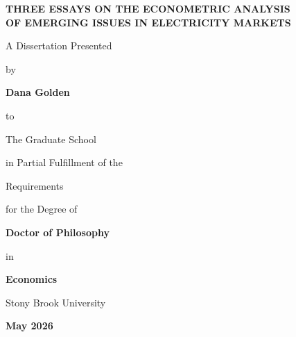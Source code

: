 \begin{titlepage}
\thispagestyle{empty}
\begin{singlespace}
\begin{center}
\vspace*{0.5in}

{\Large\bfseries THREE ESSAYS ON THE ECONOMETRIC ANALYSIS\\
OF EMERGING ISSUES IN ELECTRICITY MARKETS}

\vspace{1.0in}

A Dissertation Presented

\vspace{0.25in}

by

\vspace{0.25in}

{\large\bfseries Dana Golden}

\vspace{0.25in}

to

\vspace{0.25in}

The Graduate School

\vspace{0.15in}

in Partial Fulfillment of the

\vspace{0.05in}

Requirements

\vspace{0.05in}

for the Degree of

\vspace{0.25in}

{\large\bfseries Doctor of Philosophy}

\vspace{0.15in}

in

\vspace{0.15in}

{\large\bfseries Economics}

\vspace{0.4in}

Stony Brook University

\vspace{0.25in}

{\bfseries May 2026}

\vfill
\end{center}
\end{singlespace}
\end{titlepage}
